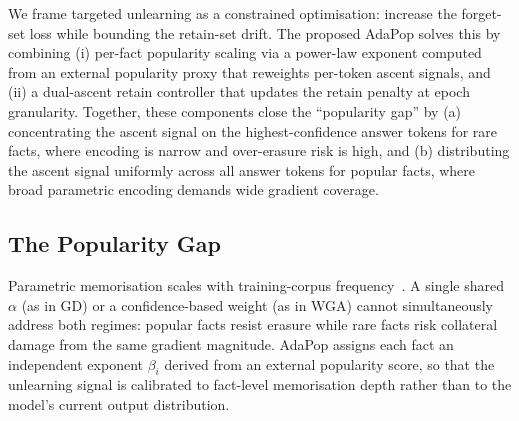 We frame targeted unlearning as a constrained optimisation: increase the forget-set loss while bounding the retain-set drift. The proposed AdaPop solves this by combining (i) per-fact popularity scaling via a power-law exponent computed from an external popularity proxy that reweights per-token ascent signals, and (ii) a dual-ascent retain controller that updates the retain penalty at epoch granularity. Together, these components close the ``popularity gap'' by (a) concentrating the ascent signal on the highest-confidence answer tokens for rare facts, where encoding is narrow and over-erasure risk is high, and (b) distributing the ascent signal uniformly across all answer tokens for popular facts, where broad parametric encoding demands wide gradient coverage.



\subsection{The Popularity Gap}

Parametric memorisation scales with training-corpus frequency~\cite{hartmann2024undesirable, kandpal2023large}. A single shared $\alpha$ (as in GD) or a confidence-based weight (as in WGA) cannot simultaneously address both regimes: popular facts resist erasure while rare facts risk collateral damage from the same gradient magnitude. AdaPop assigns each fact an independent exponent $\beta_i$ derived from an external popularity score, so that the unlearning signal is calibrated to fact-level memorisation depth rather than to the model's current output distribution.



